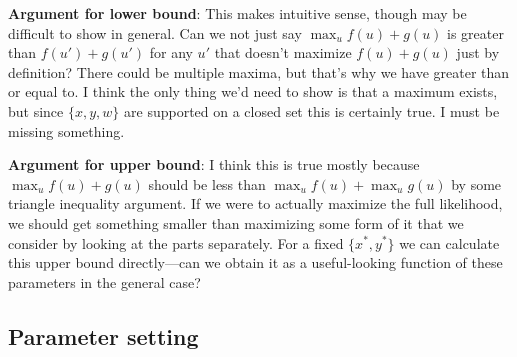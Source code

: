 \documentclass[a4paper]{article}
\begin{document}
\textbf{Argument for lower bound}: This makes intuitive sense, though may be difficult to show in general.
Can we not just say $\max_u f(u) + g(u)$ is greater than $f(u') + g(u')$ for any $u'$ that doesn't maximize $f(u) + g(u)$ just by definition?
There could be multiple maxima, but that's why we have greater than or equal to.
I think the only thing we'd need to show is that a maximum exists, but since $\{x,y,w\}$ are supported on a closed set this is certainly true.
I must be missing something.

\textbf{Argument for upper bound}: I think this is true mostly because $\max_u f(u) + g(u)$ should be less than $\max_u f(u) + \max_u g(u)$ by some triangle inequality argument.
If we were to actually maximize the full likelihood, we should get something smaller than maximizing some form of it that we consider by looking at the parts separately.
For a fixed $\{x^*, y^*\}$ we can calculate this upper bound directly---can we obtain it as a useful-looking function of these parameters in the general case?

\subsection{Parameter setting}
\end{document}
